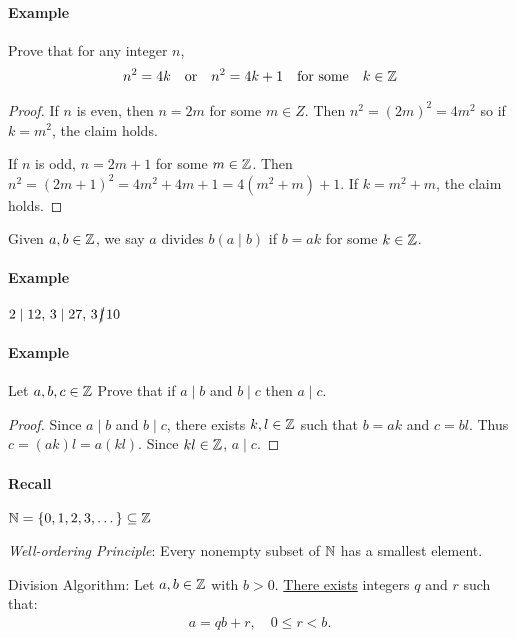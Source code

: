 \documentclass[../main.tex]{subfiles}
\begin{document}
\newpage
{} 

\paragraph{Example} Prove that for any integer $n$,
\begin{align*}
    n^2 = 4k \qor n^2 = 4k + 1 \qqtext{for some} k \in \Z
\end{align*}

\begin{proof}
    If $n$ is even, then $n = 2m$ for some $m \in Z$. Then $n^2 = (2m)^2 = 4m^2$ so
    if $k = m^2$, the claim holds.

    If $n$ is odd, $n = 2m +1$ for some $m \in \mathbb{Z}$.
    Then $n^2 = (2m + 1)^2 = 4m^2 + 4m + 1 = 4(m^2 + m) + 1$.
    If $k = m^2 + m$, the claim holds.
\end{proof}

\begin{definition}
    Given $a, b \in \mathbb{Z}$, we say $a$ divides $b (a \mid b)$ if $b = a k$ for some $k \in \mathbb{Z}$.
\end{definition}

\paragraph{Example} $2 \mid 12,\, 3 \mid  27,\, 3 \,\cancel{\mid}\, 10 $

\paragraph{Example} Let $a, b, c \in \mathbb{Z}$ Prove that if $a \mid b$ and $b \mid c$ then $a \mid c$.

\begin{proof}
    Since $a \mid b$ and $b \mid c$, there exists $k, l \in \mathbb{Z}$ such that $b = ak$ and $c = bl$. 
    Thus $c = (ak) l = a(kl)$. Since $kl \in \mathbb{Z}$, $a \mid c$.
\end{proof}

\paragraph{Recall} $\mathbb{N} = \{0 , 1, 2, 3, \dots\} \subseteq \mathbb{Z}$

\emph{Well-ordering Principle}: Every nonempty subset of $\mathbb{N}$ has a smallest element.

\begin{theorem}
    Division Algorithm: Let $a, b \in \mathbb{Z}$ with $b > 0$. \underline{There exists} 
    integers $q$ and $r$ such
    that:
    \begin{align*}
        a = qb + r,\quad 0 \leq r < b.
    \end{align*}
\end{theorem}
\end{document}
